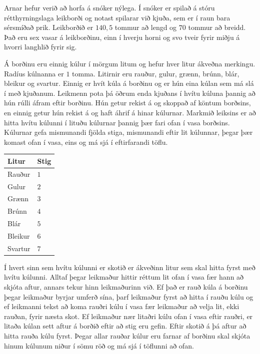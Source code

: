 
Arnar hefur verið að horfa á snóker nýlega.
Í snóker er spilað á stóru rétthyrningslaga leikborði og notast spilarar við kjuða, sem er í raun bara sérsmíðað prik.
Leikborðið er $140{,}5$ tommur að lengd og $70$ tommur að breidd.
Það eru sex vasar á leikborðinu, einn í hverju horni og svo tveir fyrir miðju á hvorri langhlið fyrir sig.

Á borðinu eru einnig kúlur í mörgum litum og hefur hver litur ákveðna merkingu.
Radíus kúlnanna er $1$ tomma.
Litirnir eru rauður, gulur, grænn, brúnn, blár, bleikur og svartur.
Einnig er hvít kúla á borðinu og er hún eina kúlan sem má slá í með kjuðanum.
Leikmenn pota þá öðrum enda kjuðans í hvítu kúluna þannig að hún rúlli áfram eftir borðinu.
Hún getur rekist á og skoppað af köntum borðsins, en einnig getur hún rekist á og haft áhrif á hinar kúlurnar.
Markmið leiksins er að hitta hvítu kúlunni í lituðu kúlurnar þannig þær fari ofan í vasa borðsins.
Kúlurnar gefa mismunandi fjölda stiga, mismunandi eftir lit kúlunnar, þegar þær komast ofan í vasa, eins og má sjá í eftirfarandi töflu.

\begin{center}
\begin{tabular}{|l|l|}
\hline
    Litur   & Stig \\ \hline
    Rauður  & $1$  \\ \hline
    Gulur   & $2$  \\ \hline
    Grænn   & $3$  \\ \hline
    Brúnn   & $4$  \\ \hline
    Blár    & $5$  \\ \hline
    Bleikur & $6$  \\ \hline
    Svartur & $7$  \\ \hline
\end{tabular}
\end{center}

Í hvert sinn sem hvítu kúlunni er skotið er ákveðinn litur sem skal hitta fyrst með hvítu kúlunni.
Alltaf þegar leikmaður hittir réttum lit ofan í vasa fær hann að skjóta aftur, annars tekur hinn leikmaðurinn við.
Ef það er rauð kúla á borðinu þegar leikmaður byrjar umferð sína, þarf leikmaður fyrst að hitta í rauðu kúlu
og ef leikmanni tekst að koma rauðri kúlu í vasa fær leikmaður að velja lit, ekki rauðan, fyrir næsta skot.
Ef leikmaður nær litaðri kúlu ofan í vasa eftir rauðri, er litaða kúlan sett aftur á borðið eftir að stig eru gefin.
Eftir skotið á þá aftur að hitta rauða kúlu fyrst.
Þegar allar rauðar kúlur eru farnar af borðinu skal skjóta hinum kúlunum niður í sömu röð og má sjá í töflunni að ofan.

